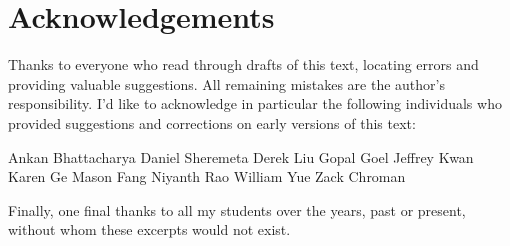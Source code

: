 \chapter{Acknowledgements}
Thanks to everyone who read through drafts of this text,
locating errors and providing valuable suggestions.
All remaining mistakes are the author's responsibility.
I'd like to acknowledge in particular the following individuals
who provided suggestions and corrections on early versions of this text:
\begin{itemize}
	\ii Ankan Bhattacharya
	\ii Daniel Sheremeta
	\ii Derek Liu
	\ii Gopal Goel
	\ii Jeffrey Kwan
	\ii Karen Ge
	\ii Mason Fang
	\ii Niyanth Rao
	\ii William Yue
	\ii Zack Chroman
\end{itemize}
Finally, one final thanks to all my students over the years,
past or present, without whom these excerpts would not exist.
